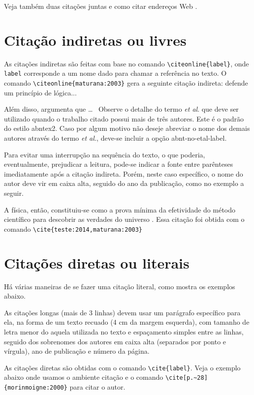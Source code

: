 Veja também duas citações juntas \cite{Zimmermann,GomideandPed} e como citar
endereços Web \cite{irl:06}.


\section{Citação indiretas ou livres}\label{ciação direta}

As citações indiretas são feitas com base no comando \verb|\citeonline{label}|, onde \verb|label| corresponde a um nome dado para chamar a referência no texto. O comando \verb|\citeonline{maturana:2003}| gera a seguinte citação indireta:  defende um princípio de lógica...

Além disso,  argumenta que \ldots\mbox{ } Observe o detalhe do termo \textit{et al}.
que deve ser utilizado quando o trabalho citado possui mais de três autores. Este é o padrão do estilo {\ttfamily abntex2}.
Caso por algum motivo não deseje abreviar o nome dos demais autores através do termo \textit{et al.}, deve-se incluir a opção {\ttfamily abnt-no-etal-label}.

Para evitar uma interrupção na sequência do texto, o que poderia, eventualmente, prejudicar a leitura, pode-se indicar a fonte entre parênteses imediatamente após a citação indireta. Porém, neste caso específico, o nome do autor deve vir em caixa alta, seguido do ano da publicação, como no exemplo a seguir.

A física, então, constituiu-se como a prova mínima da efetividade do método científico para descobrir as verdades do universo \cite{teste:2014,maturana:2003}. Essa citação foi obtida com o comando \verb|\cite{teste:2014,maturana:2003}|


\section{Citações diretas ou literais}\label{citacoesdiretas}

Há várias maneiras de se fazer uma citação literal, como mostra os exemplos abaixo.

As citações longas (mais de 3 linhas) devem usar um parágrafo específico para ela, na forma de um texto recuado (4 cm da margem esquerda), com tamanho de letra menor do aquela utilizada no texto e espaçamento simples entre as linhas, seguido dos sobrenomes dos autores em caixa alta (separados por ponto e vírgula), ano de publicação e número da página.

As citações diretas são obtidas com o comando \verb|\cite{label}|. Veja o exemplo abaixo onde usamos o ambiente citação e o comando \verb|\cite[p.~28]{morinmoigne:2000}| para citar o autor.


